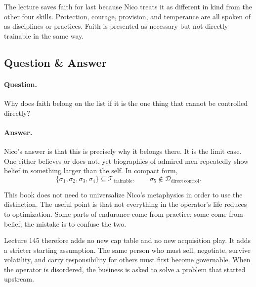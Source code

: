 \documentclass[11pt,oneside]{book}
\begin{document}
The lecture saves faith for last because Nico treats it as different in kind from the other four skills. Protection, courage, provision, and temperance are all spoken of as disciplines or practices. Faith is presented as necessary but not directly trainable in the same way.

\subsection{Question \& Answer}

\paragraph{Question.} Why does faith belong on the list if it is the one thing that cannot be controlled directly?

\paragraph{Answer.} Nico's answer is that this is precisely why it belongs there. It is the limit case. One either believes or does not, yet biographies of admired men repeatedly show belief in something larger than the self. In compact form,
\begin{equation}
\{\sigma_1,\sigma_2,\sigma_3,\sigma_4\}\subseteq \mathcal{T}_{\mathrm{trainable}},
\qquad
\sigma_5\notin \mathcal{D}_{\mathrm{direct\ control}}.
\end{equation}

This book does not need to universalize Nico's metaphysics in order to use the distinction. The useful point is that not everything in the operator's life reduces to optimization. Some parts of endurance come from practice; some come from belief; the mistake is to confuse the two.

Lecture 145 therefore adds no new cap table and no new acquisition play. It adds a stricter starting assumption. The same person who must sell, negotiate, survive volatility, and carry responsibility for others must first become governable. When the operator is disordered, the business is asked to solve a problem that started upstream.

\end{document}
